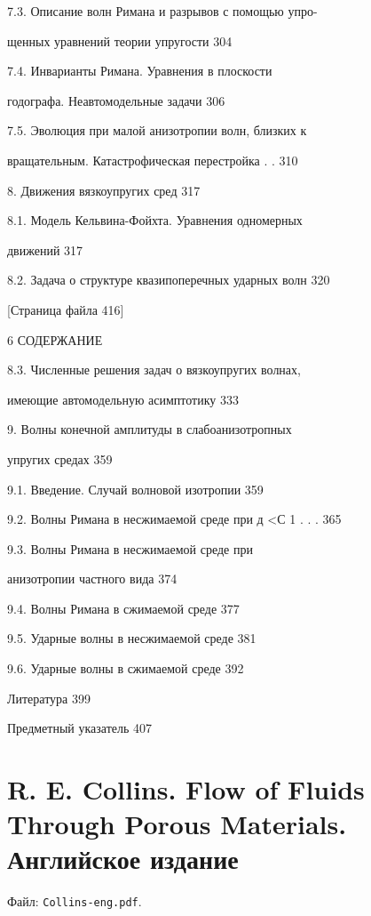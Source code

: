 \documentclass[
  11pt,
]{article}
\begin{document}
7.3. Описание волн Римана и разрывов с помощью упро- \par
щенных уравнений теории упругости 304 \par
7.4. Инварианты Римана. Уравнения в плоскости \par
годографа. Неавтомодельные задачи 306 \par
7.5. Эволюция при малой анизотропии волн, близких к \par
вращательным. Катастрофическая перестройка . . 310 \par
8. Движения вязкоупругих сред 317 \par
8.1. Модель Кельвина-Фойхта. Уравнения одномерных \par
движений 317 \par
8.2. Задача о структуре квазипоперечных ударных волн 320 \par
\smallskip
\smallskip
\smallskip
{[}Страница файла 416{]}\par
6 СОДЕРЖАНИЕ \par
8.3. Численные решения задач о вязкоупругих волнах, \par
имеющие автомодельную асимптотику 333 \par
9. Волны конечной амплитуды в слабоанизотропных \par
упругих средах 359 \par
9.1. Введение. Случай волновой изотропии 359 \par
9.2. Волны Римана в несжимаемой среде при д \textless С 1 . . . 365 \par
9.3. Волны Римана в несжимаемой среде при \par
анизотропии частного вида 374 \par
9.4. Волны Римана в сжимаемой среде 377 \par
9.5. Ударные волны в несжимаемой среде 381 \par
9.6. Ударные волны в сжимаемой среде 392 \par
Литература 399 \par
Предметный указатель 407\par
\endgroup


\section{R. E. Collins. Flow of Fluids Through Porous Materials. Английское издание}\label{section-07}

Файл: \texttt{Collins-eng.pdf}.
\end{document}
